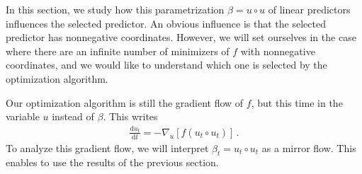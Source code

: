 \documentclass[11pt,reqno]{article}
\newcommand{\diff}{\mathrm{d}}
\numberwithin{equation}{section}
\theoremstyle{plain}
\theoremstyle{definition}
\theoremstyle{remark}
\begin{document}
In this section, we study how this parametrization $\beta = u \circ u$ of linear predictors influences the selected predictor. An obvious influence is that the selected predictor has nonnegative coordinates. However, we will set ourselves in the case where there are an infinite number of minimizers of $f$ with nonnegative coordinates, and we would like to understand which one is selected by the optimization algorithm.

Our optimization algorithm is still the gradient flow of $f$, but this time in the variable $u$ instead of $\beta$. This writes 
\begin{align}
	\label{eq:gradient-flow-dln}
	\frac{\diff u_t}{\diff t} = - \nabla_u \left[ f(u_t\circ u_t) \right]\, . 
\end{align}
To analyze this gradient flow, we will interpret $\beta_t = u_t\circ u_t$ as a mirror flow. This enables to use the results of the previous section.
\end{document}
